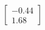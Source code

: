 \documentclass[preview]{standalone}
\begin{document}
\begin{align*}
\begin{bmatrix} -0.44 \\ 1.68 \end{bmatrix}
\end{align*}
\end{document}
